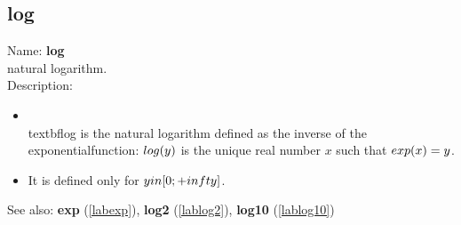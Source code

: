 \subsection{log}
\label{lablog}
\noindent Name: \textbf{log}\\
natural logarithm.\\
\noindent Description: \begin{itemize}

\item \\textbf{log} is the natural logarithm defined as the inverse of the exponential\n   function: $\\log(y)$ is the unique real number $x$ such that $\\exp(x)=y$.\n
\item It is defined only for $y \\in [0; +\\infty]$.\n\end{itemize}
See also: \textbf{exp} (\ref{labexp}), \textbf{log2} (\ref{lablog2}), \textbf{log10} (\ref{lablog10})
